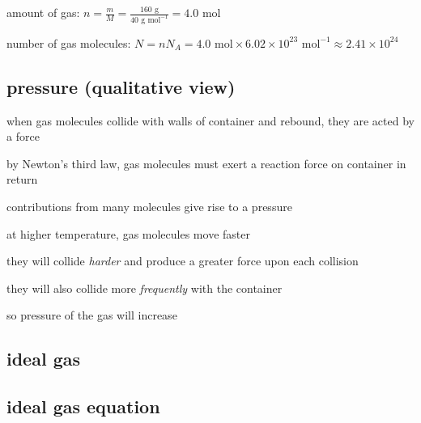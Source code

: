 
\sol amount of gas: $n=\frac{m}{M} = \frac{160 \text{ g}}{40 \text{ g mol}^{-1}} = 4.0 \text{ mol}$

number of gas molecules: $N = n N_A = 4.0 \text{ mol} \times 6.02\times10^{23} \text{ mol}^{-1} \approx 2.41 \times 10^{24}$ \eoe

	




\subsection{pressure (qualitative view)}

when gas molecules collide with walls of container and rebound, they are acted by a force

by Newton's third law, gas molecules must exert a reaction force on container in return

contributions from many molecules give rise to a pressure


\sol at higher temperature, gas molecules move faster

they will collide \emph{harder} and produce a greater force upon each collision

they will also collide more \emph{frequently} with the container

so pressure of the gas will increase \eoe





\subsection{ideal gas}

\subsection{ideal gas equation}

\rcyskip

